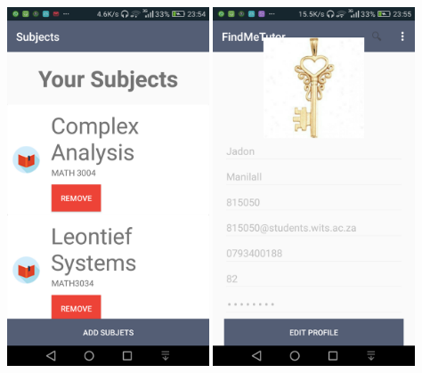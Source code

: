 \documentclass[12pt]{article}
\begin{document}
\begin{flushleft}
\includegraphics[width=60mm]{./Sprint3Models/Screenshot/subjects.png}
\includegraphics[width=60mm]{./Sprint3Models/Screenshot/editprofile.png}
\end{flushleft}
\end{document}

